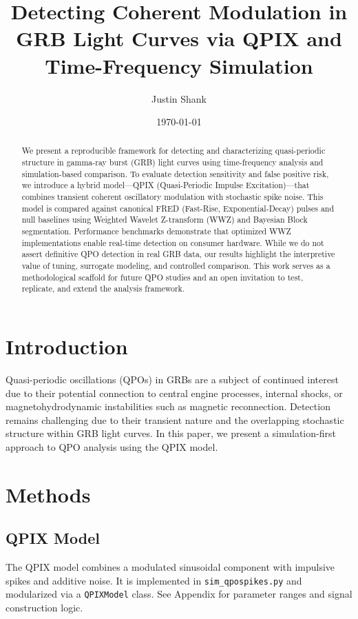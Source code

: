 \documentclass[11pt]{article}
\title{Detecting Coherent Modulation in GRB Light Curves via QPIX and Time-Frequency Simulation}
\author[1]{Justin Shank}
\affil[1]{Cognisi Systems, Independent Research Lab, \texttt{justin@cognisi.io}}
\date{\today}
\begin{document}
\maketitle

\begin{abstract}
We present a reproducible framework for detecting and characterizing quasi-periodic structure in gamma-ray burst (GRB) light curves using time-frequency analysis and simulation-based comparison. To evaluate detection sensitivity and false positive risk, we introduce a hybrid model---QPIX (Quasi-Periodic Impulse Excitation)---that combines transient coherent oscillatory modulation with stochastic spike noise. This model is compared against canonical FRED (Fast-Rise, Exponential-Decay) pulses and null baselines using Weighted Wavelet Z-transform (WWZ) and Bayesian Block segmentation. Performance benchmarks demonstrate that optimized WWZ implementations enable real-time detection on consumer hardware. While we do not assert definitive QPO detection in real GRB data, our results highlight the interpretive value of tuning, surrogate modeling, and controlled comparison. This work serves as a methodological scaffold for future QPO studies and an open invitation to test, replicate, and extend the analysis framework.
\end{abstract}

\section{Introduction}
Quasi-periodic oscillations (QPOs) in GRBs are a subject of continued interest due to their potential connection to central engine processes, internal shocks, or magnetohydrodynamic instabilities such as magnetic reconnection. Detection remains challenging due to their transient nature and the overlapping stochastic structure within GRB light curves. In this paper, we present a simulation-first approach to QPO analysis using the QPIX model.

\section{Methods}
\subsection{QPIX Model}
The QPIX model combines a modulated sinusoidal component with impulsive spikes and additive noise. It is implemented in \texttt{sim\_qpospikes.py} and modularized via a \texttt{QPIXModel} class. See Appendix for parameter ranges and signal construction logic.
\end{document}
